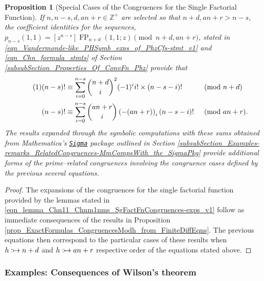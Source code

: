 \documentclass[12pt,reqno]{article}
\numberwithin{sfootnote}{section}
\numberwithin{equation}{section}
\newcommand{\tagonce}[0]{
     \addtocounter{equation}{1}
     \tag{\theequation}
}
\theoremstyle{plain}
\newtheorem{prop}[theorem]{Proposition}
\theoremstyle{definition}
\theoremstyle{remark}
\newcommand{\defmapsto}{\ensuremath{\vcentcolon\mapsto}}
\newcommand{\Mm}[0]{\emph{Mathematica}}
\newcommand{\SigmaPkg}[0]{%
     \href{http://www.risc.jku.at/research/combinat/software/Sigma/index.php}{%
     \texttt{Sigma}}
}
\newcommand{\Pochhammer}[2]{\ensuremath{\left(#1\right)_{#2}}}
\newcommand{\pn}[3]{\ensuremath{p_{#1}\left(#2, #3\right)}}
\newcommand{\ConvFP}[4]{\ensuremath{\FP_{#1}\left(#2, #3; #4\right)}}
\DeclareMathOperator{\FP}{FP}
\begin{document}
\begin{prop}[Special Cases of the Congruences for the Single Factorial Function]  
If $n,n-s,d,an+r \in \mathbb{Z}^{+}$ are selected so that 
$n+d, an+r > n-s$, the coefficient identities for the sequences, 
$\pn{n-s}{1}{1} = [z^{n-s}] \ConvFP{n+d}{1}{1}{z} \pmod{n+d, an+r}$, stated in 
\eqref{eqn_Vandermonde-like_PHSymb_exps_of_PhzCfs-stmt_v1} and 
\eqref{eqn_Chn_formula_stmts} of 
Section \ref{subsubSection_Properties_Of_ConvFn_Phz} 
provide that 
\begin{align*} 
\tagonce\label{eqn_SingFactFn_nms_first_ChnSumExps_Modnpd_Modanpr-stmts_v1} 
(n-s)! 
     & \equiv \sum_{i=0}^{n-s} \binom{n+d}{i}^{2} (-1)^{i} i! \times 
     (n-s-i)! && \pmod{n+d} \\ 
(n-s)! 
     & \equiv \sum_{i=0}^{n-s} \binom{an+r}{i} 
     \Pochhammer{-(an+r)}{i} (n-s-i)! && \pmod{an+r}. %
\end{align*} 
The results expanded through the symbolic computations with these sums 
obtained from \Mm{}'s \SigmaPkg package outlined in 
Section \ref{subsubSection_Examples-remarks_RelatedCongruences-MmCompsWith_the_SigmaPkg}
provide additional forms of the prime--related congruences 
involving the congruence cases defined by the previous several equations. 
\end{prop} 
\begin{proof} 
The expansions of the congruences for the single factorial function 
provided by the lemmas stated in 
\eqref{eqn_lemma_Chn11_Chnm1nms_SgFactFnCongruences-exps_v1} 
follow as immediate consequences of the results in 
Proposition \ref{prop_ExactFormulas_CongruencesModh_from_FiniteDiffEqns}. 
The previous equations then correspond to the particular cases of these 
results when $h \defmapsto n+d$ and $h \defmapsto an+r$ 
respective order of the equations stated above. 
\end{proof} 

\subsubsection{Examples: Consequences of Wilson's theorem} 
\end{document}
